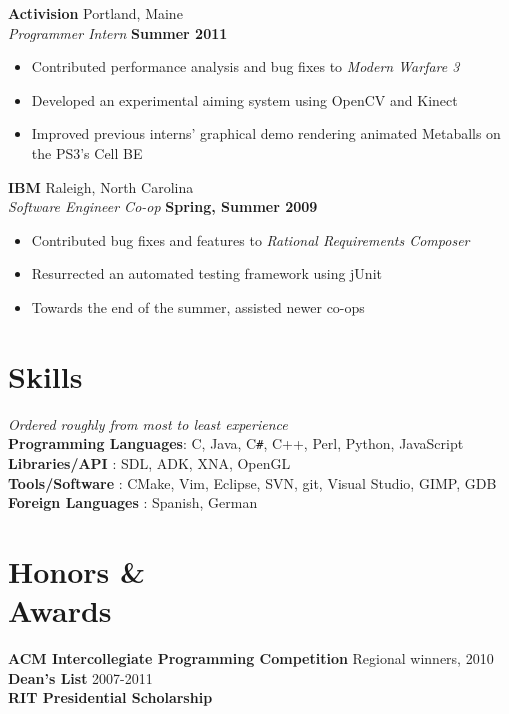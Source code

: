 \documentclass[line,margin]{res}
\newcommand{\CS}{C\texttt{\#}}
\begin{document}
\begin{resume}
    \textbf{Activision} \hfill Portland, Maine  \\
    \textit{Programmer Intern} \hfill \textbf{Summer 2011}
    \vspace{0.05in}
    \begin{itemize}
        \item Contributed performance analysis and bug fixes to \textit{Modern Warfare 3}
        \item Developed an experimental aiming system using OpenCV and Kinect
        \item Improved previous interns' graphical demo rendering animated Metaballs on the PS3's Cell BE 
    \end{itemize}

    \textbf{IBM} \hfill Raleigh, North Carolina  \\
    \textit{Software Engineer Co-op} \hfill \textbf{Spring, Summer 2009}
    \vspace{0.05in}
    \begin{itemize}
        \item Contributed bug fixes and features to \textit{Rational Requirements Composer}
        \item Resurrected an automated testing framework using jUnit
        \item Towards the end of the summer, assisted newer co-ops 
    \end{itemize}


\section{\sc Skills}          
    \textit{\small Ordered roughly from most to least experience}                           \\
    \textbf{Programming Languages}: C, Java, \CS, C++, Perl, Python, JavaScript             \\
    \textbf{Libraries/API        }: SDL, ADK, XNA, OpenGL                                   \\
    \textbf{Tools/Software       }: CMake, Vim, Eclipse, SVN, git, Visual Studio, GIMP, GDB \\
    \textbf{Foreign Languages    }: Spanish, German

\section{\sc Honors \& \\ Awards}          
    \textbf{ACM Intercollegiate Programming Competition} \hfill Regional winners, 2010              \\
    \textbf{Dean's List} \hfill                                              2007-2011              \\
    \textbf{RIT Presidential Scholarship}                                                           
 

\end{resume}
\end{document}
